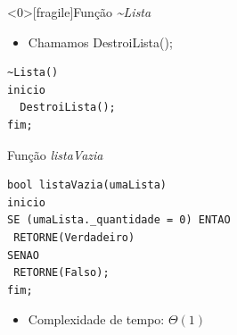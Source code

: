 \documentclass[12pt,table,xcolor={dvipsnames}]{beamer}
\begin{document}
\begin{frame}<0>[fragile]{Função \textit{\~{}Lista}}

\begin{itemize}
\item Chamamos DestroiLista();
\end{itemize}
\begin{lstlisting}
~Lista()
inicio
  DestroiLista();
fim;
\end{lstlisting}
\end{frame}

\begin{frame}[fragile]{Função \textit{listaVazia}}

\begin{lstlisting}
bool listaVazia(umaLista)
inicio
SE (umaLista._quantidade = 0) ENTAO
 RETORNE(Verdadeiro)
SENAO
 RETORNE(Falso);
fim;
\end{lstlisting}
\begin{itemize}
	\item Complexidade de tempo: $\Theta(1)$
\end{itemize}
\end{frame}
\end{document}
